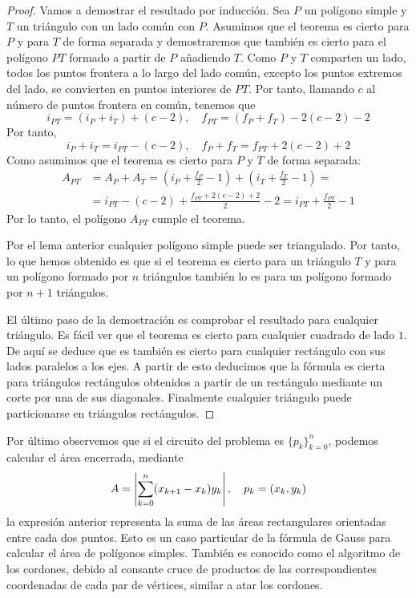 \documentclass[a4paper,12pt]{article}
\begin{document}
\begin{proof}
    Vamos a demostrar el resultado por inducción. Sea $P$ un polígono simple y $T$ un triángulo con un lado común con $P$. Asumimos que el teorema es cierto para $P$ y para $T$ de forma separada y demostraremos que también es cierto para el polígono $PT$ formado a partir de $P$ añadiendo $T$. Como $P$ y $T$ comparten un lado, todos los puntos frontera a lo largo del lado común, excepto los puntos extremos del lado, se convierten en puntos interiores de $PT$. Por tanto, llamando $c$ al número de puntos frontera en común, tenemos que
    $$i_{PT}=(i_P + i_T) + ( c - 2 ), \quad f_{PT}=(f_P+f_T) - 2(c-2)-2$$
    Por tanto,
    $$i_P+i_T = i_{PT}-(c-2), \quad f_P+f_T=f_{PT}+2(c-2)+2$$
    Como asumimos que el teorema es cierto para $P$ y $T$ de forma separada:
    \begin{equation*} 
        \begin{split}            
            A_{PT} & = A_P + A_T = \left(i_P+\frac{f_P}{2}-1\right) + \left(i_T+\frac{f_T}{2}-1\right) = \\
                   & = i_{PT} - (c - 2) + \frac{f_{PT}+2(c-2)+2}{2}-2 = i_{PT}+\frac{f_{PT}}{2} - 1
        \end{split}
    \end{equation*}
    Por lo tanto, el polígono $A_{PT}$ cumple el  teorema.

    Por el lema anterior cualquier polígono simple puede ser triangulado. Por tanto, lo que hemos obtenido es que si el teorema es cierto para un triángulo $T$ y para un polígono formado por $n$ triángulos también lo es para un polígono formado por $n+1$ triángulos.

    El último paso de la demostración es comprobar el resultado para cualquier triángulo. Es fácil ver que el teorema es cierto para cualquier cuadrado de lado $1$. De aquí se deduce que es también es cierto para cualquier rectángulo con sus lados paralelos a los ejes. A partir de esto deducimos que la fórmula es cierta para triángulos rectángulos obtenidos a partir de un rectángulo mediante un corte por una de sus diagonales. Finalmente cualquier triángulo puede particionarse en triángulos rectángulos.
\end{proof}

Por último observemos que si el circuito del problema es $\{p_k\}_{k=0}^n$, podemos calcular el área encerrada, mediante
$$A=\left| \sum_{k=0}^n(x_{k+1} - x_k)y_k\right|, \quad p_k=(x_k,y_k)$$
la expresión anterior representa la suma de las áreas rectangulares orientadas entre cada dos puntos.
Esto es un caso particular de la fórmula de Gauss para calcular el área de polígonos simples. También es conocido como el algoritmo de los cordones, debido al consante cruce de productos de las correspondientes coordenadas de cada par de vértices, similar a atar los cordones.
\end{document}
